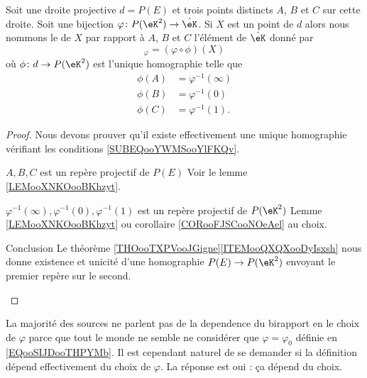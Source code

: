 \begin{propositionDef}      \label{DEFooBFSKooDwzwmO}
    Soit une droite projective \( d=P(E)\) et trois points distincts \( A\), \( B\) et \( C\) sur cette droite. Soit une bijection \( \varphi\colon P(\eK^2)\to \hat\eK\). Si \( X\) est un point de \( d\) alors nous nommons le  de \( X\) par rapport à \( A\), \( B\) et \( C\) l'élément de \( \hat\eK\) donné par
    \begin{equation}
        [A,B,C,X]_{\varphi}=(\varphi\circ\phi)(X)
    \end{equation}
    où \( \phi\colon d\to P(\eK^2) \) est l'unique homographie telle que
    \begin{subequations}        \label{SUBEQooYWMSooYlFKQv}
        \begin{align}
            \phi(A)&=\varphi^{-1}(\infty)\\
            \phi(B)&=\varphi^{-1}(0)\\
            \phi(C)&=\varphi^{-1}(1).
        \end{align}
    \end{subequations}
\end{propositionDef}

\begin{proof}
    Nous devons prouver qu'il existe effectivement une unique homographie vérifiant les conditions \eqref{SUBEQooYWMSooYlFKQv}.
    \begin{subproof}
        \item[\( A,B,C\) est un repère projectif de \( P(E)\)] 
            Voir le lemme \ref{LEMooXNKOooBKhzyt}.

        \item[\(   \varphi^{-1}(\infty), \varphi^{-1}(0), \varphi^{-1}(1)  \) est un repère projectif de \( P(\eK^2)\)]
            Lemme \ref{LEMooXNKOooBKhzyt} ou corollaire \ref{CORooFJSCooNOeAel} au choix.
        \item[Conclusion]
            Le théorème \ref{THOooTXPVooJGigne}\ref{ITEMooQXQXooDyIsxsh} nous donne existence et unicité d'une homographie \( P(E)\to P(\eK^2) \) envoyant le premier repère sur le second.
    \end{subproof}
\end{proof}

\begin{remark}  
    La majorité des sources ne parlent pas de la dependence du birapport en le choix de \( \varphi\) parce que tout le monde ne semble ne considérer que \( \varphi=\varphi_0\) définie en \eqref{EQooSIJDooTHPYMb}. Il est cependant naturel de se demander si la définition dépend effectivement du choix de \( \varphi\). La réponse est oui : ça dépend du choix.
\end{remark}

